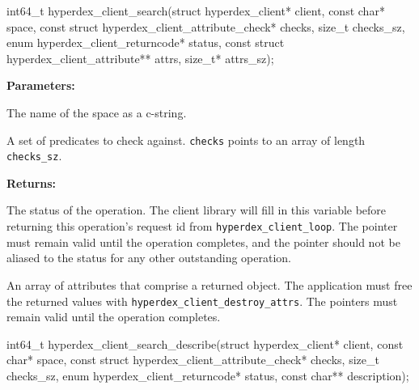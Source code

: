 \funcsep
{}
\begin{ccode}
int64_t hyperdex_client_search(struct hyperdex_client* client,
                const char* space,
                const struct hyperdex_client_attribute_check* checks, size_t checks_sz,
                enum hyperdex_client_returncode* status,
                const struct hyperdex_client_attribute** attrs, size_t* attrs_sz);
\end{ccode}
\funcdesc 

\noindent\textbf{Parameters:}
\begin{description}[labelindent=\widthof{{\texttt{checks}, \texttt{checks\_sz}}},leftmargin=*,noitemsep,nolistsep,align=right]
\item[\texttt{space}] The name of the space as a c-string.
\item[\texttt{checks}, \texttt{checks\_sz}] A set of predicates to check against.  \texttt{checks} points to an array of length \texttt{checks\_sz}.
\end{description}

\noindent\textbf{Returns:}
\begin{description}[labelindent=\widthof{{\texttt{attrs}, \texttt{attrs\_sz}}},leftmargin=*,noitemsep,nolistsep,align=right]
\item[\texttt{status}] The status of the operation.  The client library will fill in this variable before returning this operation's request id from \texttt{hyperdex\_client\_loop}.  The pointer must remain valid until the operation completes, and the pointer should not be aliased to the status for any other outstanding operation.
\item[\texttt{attrs}, \texttt{attrs\_sz}] An array of attributes that comprise a returned object.  The application must free the returned values with \texttt{hyperdex\_client\_destroy\_attrs}.  The pointers must remain valid until the operation completes.
\end{description}

\funcsep
{}
\begin{ccode}
int64_t hyperdex_client_search_describe(struct hyperdex_client* client,
                const char* space,
                const struct hyperdex_client_attribute_check* checks, size_t checks_sz,
                enum hyperdex_client_returncode* status,
                const char** description);
\end{ccode}
\funcdesc 

